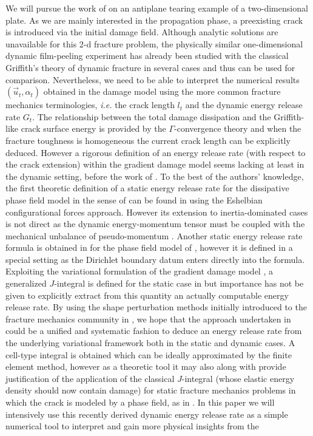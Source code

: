We will pursue the work of \cite{Bourdin:2011} on an antiplane tearing example of a two-dimensional plate. As we are mainly interested in the propagation phase, a preexisting crack is introduced via the initial damage field. Although analytic solutions are unavailable for this 2-d fracture problem, the physically similar one-dimensional dynamic film-peeling experiment has already been studied with the classical Griffith's theory of dynamic fracture in several cases \cite{Freund:1990,DumouchelMarigoCharlotte:2008,LazzaroniBargelliniDumouchelMarigo:2012} and thus can be used for comparison. Nevertheless, we need to be able to interpret the numerical results $(\vec{u}_t,\alpha_t)$ obtained in the damage model using the more common fracture mechanics terminologies, \emph{i.e.} the crack length $l_t$ and the dynamic energy release rate $G_t$. The relationship between the total damage dissipation and the Griffith-like crack surface energy is provided by the $\Gamma$-convergence theory \cite{BourdinFrancfortMarigo:2000} and when the fracture toughness is homogeneous the current crack length can be explicitly deduced. However a rigorous definition of an energy release rate (with respect to the crack extension) within the gradient damage model seems lacking at least in the dynamic setting, before the work of \cite{LiMarigo:2015}. To the best of the authors' knowledge, the first theoretic definition of a static energy release rate for the dissipative phase field model in the sense of \cite{KarmaKesslerLevine:2001} can be found in \cite{HakimKarma:2005} using the Eshelbian configurational forces approach. However its extension to inertia-dominated cases is not direct as the dynamic energy-momentum tensor must be coupled with the mechanical unbalance of pseudo-momentum \cite{Maugin:1994,Adda-BediaAriasAmarLund:1999}. Another static energy release rate formula is obtained in \cite{Negri:2013} for the phase field model of \cite{BourdinFrancfortMarigo:2000}, however it is defined in a special setting as the Dirichlet boundary datum enters directly into the formula. Exploiting the variational formulation of the gradient damage model \cite{PhamMarigo:2010-1}, a generalized $J$-integral is defined for the static case in \cite{SicsicMarigo:2013} but importance has not be given to explicitly extract from this quantity an actually computable energy release rate. By using the shape perturbation methods initially introduced to the fracture mechanics community in \cite{Destuynder:1981}, we hope that the approach undertaken in \cite{LiMarigo:2015} could be a unified and systematic fashion to deduce an energy release rate from the underlying variational framework both in the static and dynamic cases. A cell-type integral is obtained which can be ideally approximated by the finite element method, however as a theoretic tool it may also along with \cite{SicsicMarigo:2013} provide justification of the application of the classical $J$-integral (whose elastic energy density should now contain damage) for static fracture mechanics problems in which the crack is modeled by a phase field, as in \cite{HossainHsuehBourdinBhattachary:2014}. In this paper we will intensively use this recently derived dynamic energy release rate as a simple numerical tool to interpret and gain more physical insights from the 